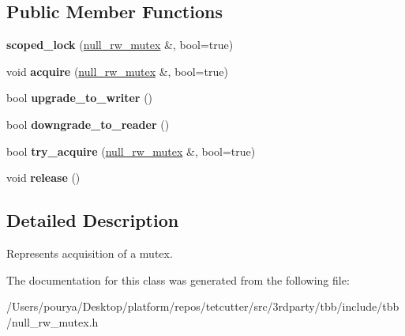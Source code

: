 \subsection*{Public Member Functions}
\begin{DoxyCompactItemize}
\item 
\hypertarget{classtbb_1_1null__rw__mutex_1_1scoped__lock_a4b7f9a3976c7744a96e435e027c6262c}{}{\bfseries scoped\+\_\+lock} (\hyperlink{classtbb_1_1null__rw__mutex}{null\+\_\+rw\+\_\+mutex} \&, bool=true)\label{classtbb_1_1null__rw__mutex_1_1scoped__lock_a4b7f9a3976c7744a96e435e027c6262c}

\item 
\hypertarget{classtbb_1_1null__rw__mutex_1_1scoped__lock_a251d45c5c42ac6c6006d0463c2173bc8}{}void {\bfseries acquire} (\hyperlink{classtbb_1_1null__rw__mutex}{null\+\_\+rw\+\_\+mutex} \&, bool=true)\label{classtbb_1_1null__rw__mutex_1_1scoped__lock_a251d45c5c42ac6c6006d0463c2173bc8}

\item 
\hypertarget{classtbb_1_1null__rw__mutex_1_1scoped__lock_a07ed8c0c225fec43b96dcec5b4d4380d}{}bool {\bfseries upgrade\+\_\+to\+\_\+writer} ()\label{classtbb_1_1null__rw__mutex_1_1scoped__lock_a07ed8c0c225fec43b96dcec5b4d4380d}

\item 
\hypertarget{classtbb_1_1null__rw__mutex_1_1scoped__lock_a899c14f8d077edd2fe7925bb82a94686}{}bool {\bfseries downgrade\+\_\+to\+\_\+reader} ()\label{classtbb_1_1null__rw__mutex_1_1scoped__lock_a899c14f8d077edd2fe7925bb82a94686}

\item 
\hypertarget{classtbb_1_1null__rw__mutex_1_1scoped__lock_afdb10af455fa8730b1a9bc8d5ca16c41}{}bool {\bfseries try\+\_\+acquire} (\hyperlink{classtbb_1_1null__rw__mutex}{null\+\_\+rw\+\_\+mutex} \&, bool=true)\label{classtbb_1_1null__rw__mutex_1_1scoped__lock_afdb10af455fa8730b1a9bc8d5ca16c41}

\item 
\hypertarget{classtbb_1_1null__rw__mutex_1_1scoped__lock_a57d0613ea1614fe9c7daa0706e56efab}{}void {\bfseries release} ()\label{classtbb_1_1null__rw__mutex_1_1scoped__lock_a57d0613ea1614fe9c7daa0706e56efab}

\end{DoxyCompactItemize}


\subsection{Detailed Description}
Represents acquisition of a mutex. 

The documentation for this class was generated from the following file\+:\begin{DoxyCompactItemize}
\item 
/\+Users/pourya/\+Desktop/platform/repos/tetcutter/src/3rdparty/tbb/include/tbb/null\+\_\+rw\+\_\+mutex.\+h\end{DoxyCompactItemize}
